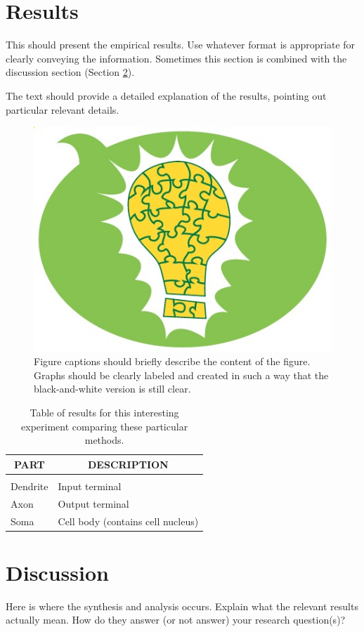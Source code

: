\documentclass[12pt]{article} %
\begin{document}
\section{Results}
\label{sec:results}
This should present the empirical results. Use whatever format is appropriate for clearly conveying the information. Sometimes this section is combined with the discussion section (Section \ref{sec:discussion}).

The text should provide a detailed explanation of the results, pointing out particular relevant details.

\begin{figure}[h]
\label{fig:myGraph}
\begin{center}
\includegraphics[width=.2\textwidth]{placeholder.jpg}
\end{center}
\caption{Figure captions should briefly describe the content of the figure. Graphs should be clearly labeled and created in such a way that the black-and-white version is still clear.}
\end{figure}

\begin{table}[t]
\label{tab:myTable}
\begin{center}
\begin{tabular}{ll}
\multicolumn{1}{c}{\bf PART}  &\multicolumn{1}{c}{\bf DESCRIPTION}
\\ \hline \\
Dendrite         &Input terminal \\
Axon             &Output terminal \\
Soma             &Cell body (contains cell nucleus) \\
\end{tabular}
\caption{Table of results for this interesting experiment comparing these particular methods.}
\end{center}
\end{table}

\section{Discussion}
\label{sec:discussion}
Here is where the synthesis and analysis occurs. Explain what the relevant results actually mean. How do they answer (or not answer) your research question(s)?
\end{document}
